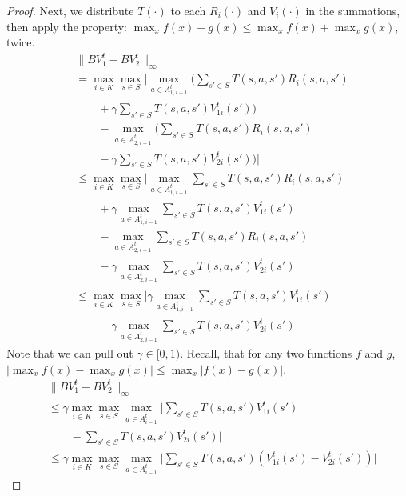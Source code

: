 \begin{proof}
Next, we distribute $T(\cdot)$ to each $R_i(\cdot)$ and $V_i(\cdot)$ in the summations, then apply the property: $\max_x f(x) + g(x) \leq \max_x f(x) + \max_x g(x)$, twice.
\begin{align*}
    &\| B V_1^t - B V_2^t \|_\infty \\
    &= \max_{i \in K} \max_{s \in S} \Big| \max_{a \in A_{1,i-1}^t} \Big( \sum_{s' \in S} T(s, a, s') R_i(s, a, s') \\
    &\quad \quad + \gamma \sum_{s' \in S} T(s, a, s') V_{1i}^t(s') \Big) \\
    &\quad \quad - \max_{a \in A_{2,i-1}^t} \Big( \sum_{s' \in S} T(s, a, s') R_i(s, a, s') \\
    &\quad \quad - \gamma \sum_{s' \in S} T(s, a, s') V_{2i}^t(s') \Big) \Big| \\
    &\leq \max_{i \in K} \max_{s \in S} \Big| \max_{a \in A_{1,i-1}^t} \sum_{s' \in S} T(s, a, s') R_i(s, a, s') \\
    &\quad \quad + \gamma \max_{a \in A_{1,i-1}^t} \sum_{s' \in S} T(s, a, s') V_{1i}^t(s') \\
    &\quad \quad - \max_{a \in A_{2,i-1}^t} \sum_{s' \in S} T(s, a, s') R_i(s, a, s') \\
    &\quad \quad - \gamma \max_{a \in A_{2,i-1}^t} \sum_{s' \in S} T(s, a, s') V_{2i}^t(s') \Big| \\
    &\leq \max_{i \in K} \max_{s \in S} \Big| \gamma \max_{a \in A_{1,i-1}^t} \sum_{s' \in S} T(s, a, s') V_{1i}^t(s') \\
    &\quad \quad - \gamma \max_{a \in A_{2,i-1}^t} \sum_{s' \in S} T(s, a, s') V_{2i}^t(s') \Big|
\end{align*}
Note that we can pull out $\gamma \in [0, 1)$. Recall, that for any two functions $f$ and $g$, $| \max_x f(x) - \max_x g(x) | \leq \max_x | f(x) - g(x) |$.
\begin{align*}
    &\| B V_1^t - B V_2^t \|_\infty \\
    &\leq \gamma \max_{i \in K} \max_{s \in S} \max_{a \in A_{i-1}^t} \Big| \sum_{s' \in S} T(s, a, s') V_{1i}^t(s') \\
    &\quad \quad - \sum_{s' \in S} T(s, a, s') V_{2i}^t(s') \Big| \\
    &\leq \gamma \max_{i \in K} \max_{s \in S} \max_{a \in A_{i-1}^t} \Big| \sum_{s' \in S} T(s, a, s') (V_{1i}^t(s') - V_{2i}^t(s')) \Big|
\end{align*}


\end{proof}
